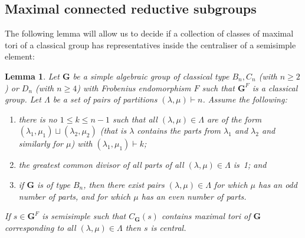 \documentclass{ert-l}
\newcommand{\bG}{{\mathbf{G}}}
\let\la=\lambda
\newtheorem{lem}[thm]{Lemma}
\theoremstyle{definition}
\theoremstyle{remark}
\begin{document}
\subsection{Maximal connected reductive subgroups}\label{subsec:maxred}
The following lemma will allow us to decide if a collection of classes of
maximal tori of a classical group has representatives inside the centraliser
of a semisimple element:

\begin{lem}   \label{lem:maxred}
 Let $\bG$ be a simple algebraic group of classical type $B_n,C_n$ (with
 $n\ge2$) or $D_n$ (with $n\ge4$) with Frobenius endomorphism $F$ such that
 $\bG^F$ is a classical group. Let $\Lambda$ be a set of pairs of partitions
 $(\la,\mu)\vdash n$. Assume the following:
 \begin{enumerate}
  \item[\rm(1)] there is no $1\le k\le n-1$ such that all $(\la,\mu)\in\Lambda$
   are of the form $(\la_1,\mu_1)\sqcup(\la_2,\mu_2)$ (that is $\la$
   contains the parts from $\la_1$ and $\la_2$ and similarly for $\mu$) with
   $(\la_1,\mu_1)\vdash k$;
  \item[\rm(2)] the greatest common divisor of all parts of all
   $(\la,\mu)\in\Lambda$ is~1; and
  \item[\rm(3)] if $\bG$ is of type $B_n$, then there exist pairs
   $(\la,\mu)\in\Lambda$ for which $\mu$ has an odd number of parts, and for
   which $\mu$ has an even number of parts.
 \end{enumerate}
 If $s\in\bG^F$ is semisimple such that $C_\bG(s)$ contains maximal tori of
 $\bG$ corresponding to all $(\la,\mu)\in\Lambda$ then $s$ is central.
\end{lem}
\end{document}
